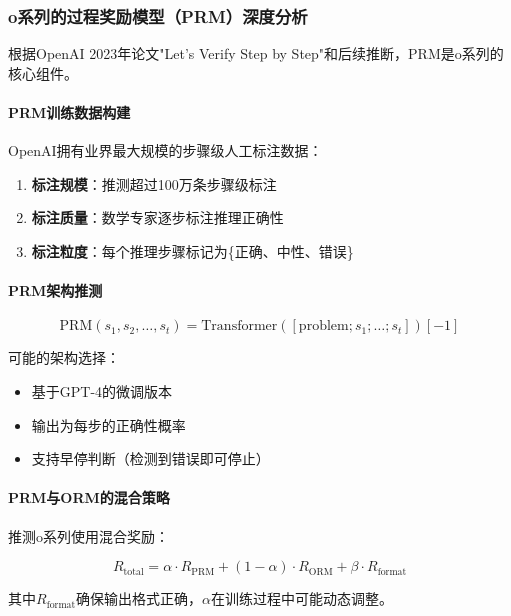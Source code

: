 \documentclass[12pt,a4paper]{article}
\begin{document}
\subsubsection{o系列的过程奖励模型（PRM）深度分析}

根据OpenAI 2023年论文"Let's Verify Step by Step"和后续推断，PRM是o系列的核心组件。

\paragraph{PRM训练数据构建}

OpenAI拥有业界最大规模的步骤级人工标注数据：

\begin{enumerate}
    \item \textbf{标注规模}：推测超过100万条步骤级标注
    \item \textbf{标注质量}：数学专家逐步标注推理正确性
    \item \textbf{标注粒度}：每个推理步骤标记为\{正确、中性、错误\}
\end{enumerate}

\paragraph{PRM架构推测}

\begin{equation}
\text{PRM}(s_1, s_2, \ldots, s_t) = \text{Transformer}([\text{problem}; s_1; \ldots; s_t])[-1]
\end{equation}

可能的架构选择：
\begin{itemize}
    \item 基于GPT-4的微调版本
    \item 输出为每步的正确性概率
    \item 支持早停判断（检测到错误即可停止）
\end{itemize}

\paragraph{PRM与ORM的混合策略}

推测o系列使用混合奖励：

\begin{equation}
R_{\text{total}} = \alpha \cdot R_{\text{PRM}} + (1-\alpha) \cdot R_{\text{ORM}} + \beta \cdot R_{\text{format}}
\end{equation}

其中$R_{\text{format}}$确保输出格式正确，$\alpha$在训练过程中可能动态调整。
\end{document}
